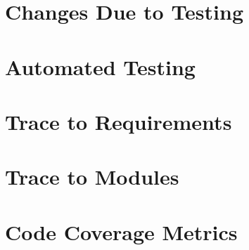 \documentclass[12pt, titlepage]{article}
\begin{document}
\section{Changes Due to Testing}

\section{Automated Testing}
		
\section{Trace to Requirements}
		
\section{Trace to Modules}		

\section{Code Coverage Metrics}




\end{document}
